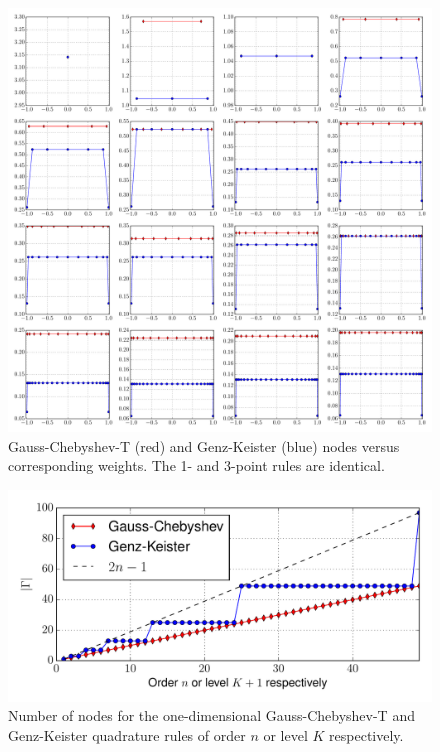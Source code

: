 \documentclass[a4paper,10pt]{article}
\begin{document}
\begin{figure}[h]
  \centering
  \includegraphics[width=\linewidth]{./img/gk_chebyshevt_nodes_1d.pdf}
  \caption{Gauss-Chebyshev-T (red) and Genz-Keister (blue) nodes versus
  corresponding weights. The 1- and 3-point rules are identical.}
  \label{fig:gk_chebyshevt_nodes_1d}
\end{figure}

\begin{figure}
  \centering
  \includegraphics[width=\linewidth]{./img/number_nodes_chebyshevt.pdf}
  \caption{Number of nodes for the one-dimensional Gauss-Chebyshev-T and Genz-Keister quadrature
  rules of order $n$ or level $K$ respectively.}
  \label{fig:number_nodes_chebyshevt}
\end{figure}
\end{document}
